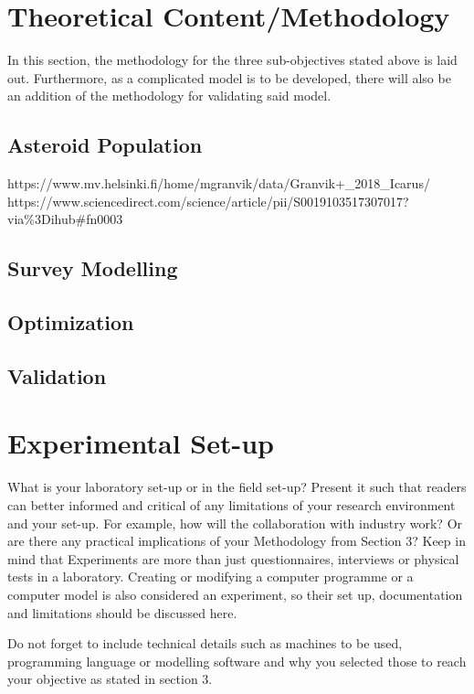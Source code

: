 \documentclass[12pt, english, NoHyper]{AE4010-template}
\begin{document}
\section{Theoretical Content/Methodology}
In this section, the methodology for the three sub-objectives stated above is laid out. Furthermore, as a complicated model is to be developed, there will also be an addition of the methodology for validating said model.

\subsection{Asteroid Population}
https://www.mv.helsinki.fi/home/mgranvik/data/Granvik+\_2018\_Icarus/
https://www.sciencedirect.com/science/article/pii/S0019103517307017?via\%3Dihub#fn0003

\subsection{Survey Modelling}


\subsection{Optimization}


\subsection{Validation}


\section{Experimental Set-up}
What is your laboratory set-up or in the field set-up? Present it such that readers can better informed and critical of any limitations of your research environment and your set-up. For example, how will the collaboration with industry work? Or are there any practical implications of your Methodology from Section 3? Keep in mind that Experiments are more than just questionnaires, interviews or physical tests in a laboratory. Creating or modifying a computer programme or a computer model is also considered an experiment, so their set up, documentation and limitations should be discussed here. 

Do not forget to include technical details such as machines to be used, programming language or modelling software and why you selected those to reach your objective as stated in section 3.
\end{document}
